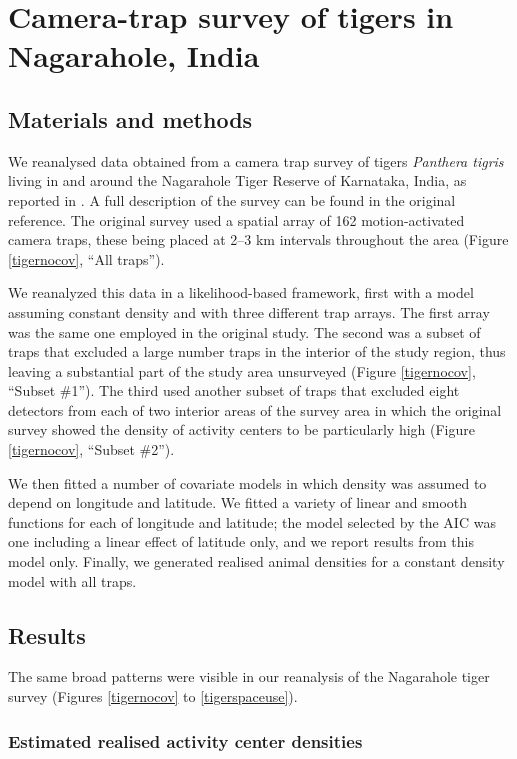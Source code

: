 \documentclass[10pt,a4paper]{article}
\begin{document}
\section{Camera-trap survey of tigers in Nagarahole, India}

\subsection{Materials and methods}
We reanalysed data obtained from a camera trap survey of tigers {\it Panthera tigris} living in and around the Nagarahole Tiger Reserve of Karnataka, India, as reported in \cite{Dorazio+Royle:03}. A full description of the survey can be found in the original reference. The original survey used a spatial array of 162 motion-activated camera traps, these being placed at 2–3 km intervals throughout the area (Figure \ref{tigernocov}, ``All traps''). 

We reanalyzed this data in a likelihood-based framework, first with a model assuming constant density and with three different trap arrays. The first array was the same one employed in the original study. The second was a subset of traps that excluded a large number traps in the interior of the study region, thus leaving a substantial part of the study area unsurveyed (Figure \ref{tigernocov}, ``Subset \#1''). The third used another subset of traps that excluded eight detectors from each of two interior areas of the survey area in which the original survey showed the density of activity centers to be particularly high (Figure \ref{tigernocov}, ``Subset \#2''). 

We then fitted a number of covariate models in which density was assumed to depend on longitude and latitude. We fitted a variety of linear and smooth functions for each of longitude and latitude; the model selected by the AIC was one including a linear effect of latitude only, and we report results from this model only. Finally, we generated realised animal densities for a constant density model with all traps.

\subsection{Results} 
The same broad patterns were visible in our reanalysis of the Nagarahole tiger survey (Figures \ref{tigernocov} to \ref{tigerspaceuse}). 

\subsubsection{Estimated realised activity center densities}
\end{document}
